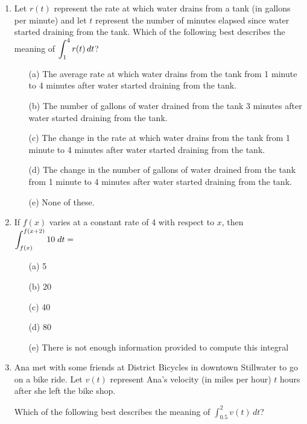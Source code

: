 \documentclass[12pt]{report}
\begin{document}
\begin{enumerate}
\item Let $r(t)$ represent the rate at which water drains from a tank (in gallons per minute) and let $t$ represent the number of minutes elapsed since water started draining from the tank. Which of the following best describes the meaning of $\displaystyle \int_{1}^4 r(t)\,dt$?\\
\begin{enumerate}
\item[(a)] The average rate at which water drains from the tank from 1 minute to 4 minutes after water started draining from the tank. \vspace{0.2cm}
\item[(b)] The number of gallons of water drained from the tank 3 minutes after water started draining from the tank. \vspace{0.2cm} 
\item[(c)] The change in the rate at which water drains from the tank from 1 minute to 4 minutes after water started draining from the tank. \vspace{0.2cm} 
\item[(d)] The change in the number of gallons of water drained from the tank from 1 minute to 4 minutes after water started draining from the tank. \vspace{0.2cm} 
\item[(e)] None of these.
\end{enumerate}

\item If $f(x)$ varies at a constant rate of 4 with respect to $x$, then $\displaystyle \int_{f(x)}^{f(x+2)} 10\; dt =$
\begin{enumerate}
\item[(a)] 5
\item[(b)] 20
\item[(c)] 40
\item[(d)] 80
\item[(e)] There is not enough information provided to compute this integral
\end{enumerate}

\item Ana met with some friends at District Bicycles in downtown Stillwater to go on a bike ride. Let $v(t)$ represent Ana's velocity (in miles per hour) $t$ hours after she left the bike shop.

Which of the following best describes the meaning of $\int_{0.5}^2 v(t)\,dt$?

\begin{enumerate}


\end{enumerate}
\end{enumerate}
\end{document}
